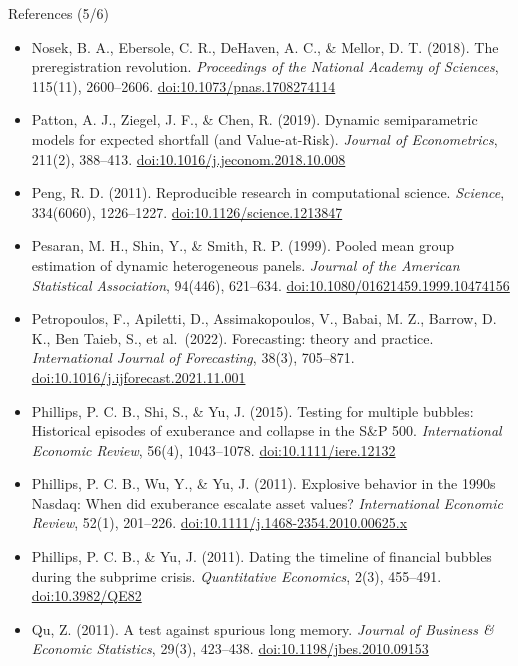 \begin{frame}{References (5/6)}
\itemsize{\tiny}
\begin{itemize}
    \item Nosek, B. A., Ebersole, C. R., DeHaven, A. C., \& Mellor, D. T. (2018). The preregistration revolution. \textit{Proceedings of the National Academy of Sciences}, 115(11), 2600--2606. \href{https://doi.org/10.1073/pnas.1708274114}{doi:10.1073/pnas.1708274114}
    \item Patton, A. J., Ziegel, J. F., \& Chen, R. (2019). Dynamic semiparametric models for expected shortfall (and Value-at-Risk). \textit{Journal of Econometrics}, 211(2), 388--413. \href{https://doi.org/10.1016/j.jeconom.2018.10.008}{doi:10.1016/j.jeconom.2018.10.008}
    \item Peng, R. D. (2011). Reproducible research in computational science. \textit{Science}, 334(6060), 1226--1227. \href{https://doi.org/10.1126/science.1213847}{doi:10.1126/science.1213847}
    \item Pesaran, M. H., Shin, Y., \& Smith, R. P. (1999). Pooled mean group estimation of dynamic heterogeneous panels. \textit{Journal of the American Statistical Association}, 94(446), 621--634. \href{https://doi.org/10.1080/01621459.1999.10474156}{doi:10.1080/01621459.1999.10474156}
    \item Petropoulos, F., Apiletti, D., Assimakopoulos, V., Babai, M. Z., Barrow, D. K., Ben Taieb, S., et al.\ (2022). Forecasting: theory and practice. \textit{International Journal of Forecasting}, 38(3), 705--871. \href{https://doi.org/10.1016/j.ijforecast.2021.11.001}{doi:10.1016/j.ijforecast.2021.11.001}
    \item Phillips, P. C. B., Shi, S., \& Yu, J. (2015). Testing for multiple bubbles: Historical episodes of exuberance and collapse in the S\&P 500. \textit{International Economic Review}, 56(4), 1043--1078. \href{https://doi.org/10.1111/iere.12132}{doi:10.1111/iere.12132}
    \item Phillips, P. C. B., Wu, Y., \& Yu, J. (2011). Explosive behavior in the 1990s Nasdaq: When did exuberance escalate asset values? \textit{International Economic Review}, 52(1), 201--226. \href{https://doi.org/10.1111/j.1468-2354.2010.00625.x}{doi:10.1111/j.1468-2354.2010.00625.x}
    \item Phillips, P. C. B., \& Yu, J. (2011). Dating the timeline of financial bubbles during the subprime crisis. \textit{Quantitative Economics}, 2(3), 455--491. \href{https://doi.org/10.3982/QE82}{doi:10.3982/QE82}
    \item Qu, Z. (2011). A test against spurious long memory. \textit{Journal of Business \& Economic Statistics}, 29(3), 423--438. \href{https://doi.org/10.1198/jbes.2010.09153}{doi:10.1198/jbes.2010.09153}

\end{itemize}
\end{frame}
